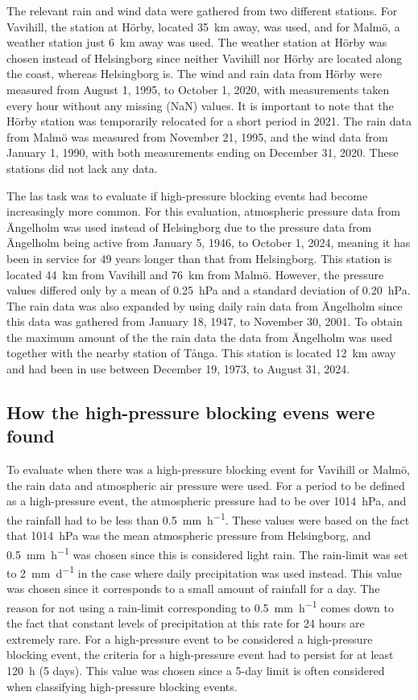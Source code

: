 The relevant rain and wind data were gathered from two different stations. For Vavihill, the station at Hörby, located \SI{35}{\km} away, was used, and for Malmö, a weather station just \SI{6}{\km} away was used. The weather station at Hörby was chosen instead of Helsingborg since neither Vavihill nor Hörby are located along the coast, whereas Helsingborg is. The wind and rain data from Hörby were measured from August 1, 1995, to October 1, 2020, with measurements taken every hour without any missing (NaN) values. It is important to note that the Hörby station was temporarily relocated for a short period in 2021. The rain data from Malmö was measured from November 21, 1995, and the wind data from January 1, 1990, with both measurements ending on December 31, 2020. These stations did not lack any data.

The las task was to evaluate if high-pressure blocking events had become increasingly more common. For this evaluation, atmospheric pressure data from Ängelholm was used instead of Helsingborg due to the pressure data from Ängelholm being active from January 5, 1946, to October 1, 2024, meaning it has been in service for 49 years longer than that from Helsingborg. This station is located \SI{44}{\km} from Vavihill and \SI{76}{\km} from Malmö. However, the pressure values differed only by a mean of \SI{0.25}{\hecto\pascal} and a standard deviation of \SI{0.20}{\hecto\pascal}. The rain data was also expanded by using daily rain data from Ängelholm since this data was gathered from January 18, 1947, to November 30, 2001. To obtain the maximum amount of the the rain data the data from Ängelholm was used together with the nearby station of Tånga. This station is located \SI{12}{\km} away and had been in use between December 19, 1973, to August 31, 2024. 

\subsection{How the high-pressure blocking evens were found}
To evaluate when there was a high-pressure blocking event for Vavihill or Malmö, the rain data and atmospheric air pressure were used. For a period to be defined as a high-pressure event, the atmospheric pressure had to be over \SI{1014}{\hecto\pascal}, and the rainfall had to be less than \SI{0.5}{\mm\per\hour}. These values were based on the fact that \SI{1014}{\hecto\pascal} was the mean atmospheric pressure from Helsingborg, and \SI{0.5}{\mm\per\hour} was chosen since this is considered light rain. The rain-limit was set to \SI{2}{\mm\per\day} in the case where daily precipitation was used instead. This value was chosen since it corresponds to a small amount of rainfall for a day. The reason for not using a rain-limit corresponding to \SI{0.5}{\mm\per\hour} comes down to the fact that constant levels of precipitation at this rate for 24 hours are extremely rare. For a high-pressure event to be considered a high-pressure blocking event, the criteria for a high-pressure event had to persist for at least \SI{120}{\hour} (5 days). This value was chosen since a 5-day limit is often considered when classifying high-pressure blocking events. 

